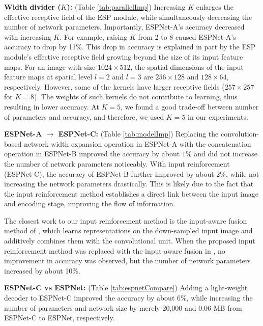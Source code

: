 \documentclass[runningheads]{llncs}
\begin{document}
\noindent \textbf{Width divider ($K$):} (Table \ref{tab:parallelImp}) Increasing $K$ enlarges the  effective receptive field of the ESP module, while simultaneously decreasing the number of network parameters. Importantly, ESPNet-A's accuracy decreased with increasing $K$. For example, raising $K$ from 2 to 8 caused  ESPNet-A's accuracy to drop by 11\%. This drop in accuracy is explained in part by the ESP module's effective receptive field growing beyond the size of its input feature maps. For an image with size $1024 \times 512$, the spatial dimensions of the input feature maps at spatial level $l=2$ and $l=3$ are $256 \times 128$ and $128 \times 64$, respectively. However, some of the kernels have larger receptive fields ($257 \times 257$ for $K=8$). The weights of such kernels do not contribute to learning, thus resulting in lower accuracy. At $K=5$, we found a good trade-off between number of parameters and accuracy, and therefore, we used $K=5$ in our experiments.

\noindent \textbf{ESPNet-A $\rightarrow$ ESPNet-C:} (Table \ref{tab:modelImp}) Replacing the convolution-based network width expansion operation in ESPNet-A with the concatenation operation in ESPNet-B improved the accuracy by about $1\%$ and did not increase the number of network parameters noticeably. With input reinforcement (ESPNet-C), the accuracy of ESPNet-B further improved by about 2\%, while not increasing the network parameters drastically. This is likely due to the fact that the input reinforcement method establishes a direct link between the input image and encoding stage, improving the flow of information. 

The closest work to our input reinforcement method is the input-aware fusion method of \cite{mehta2017learning}, which learns representations on the down-sampled input image and additively combines them with the convolutional unit. When  the proposed input reinforcement method was replaced with the input-aware fusion in \cite{mehta2017learning}, no improvement in accuracy was observed, but the number of network parameters increased by about 10\%. 

\noindent \textbf{ESPNet-C vs ESPNet:} (Table \ref{tab:espnetCompare}) Adding a light-weight decoder to ESPNet-C improved the accuracy by about 6\%, while increasing the number of parameters and network size by merely 20,000 and 0.06 MB from ESPNet-C to ESPNet, respectively.
\end{document}

